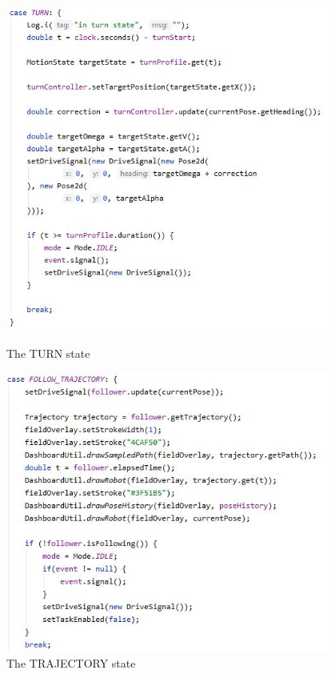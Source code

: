 \begin{figure}[ht]
\centering
\begin{minipage}[b]{.48\textwidth}
  \centering
  \includegraphics[width=0.95\textwidth]{Meetings/January/01-13-22/1-13-22 pic1 - James Hu.JPG}
  \caption{The TURN state}
  \label{fig:011322_1}
\end{minipage}%
\hfill%
\begin{minipage}[b]{.48\textwidth}
  \centering
  \includegraphics[width=0.95\textwidth]{Meetings/January/01-13-22/1-13-22 pic2 - James Hu.JPG}
  \caption{The TRAJECTORY state}
  \label{fig:011322_2}
\end{minipage}
\end{figure}

